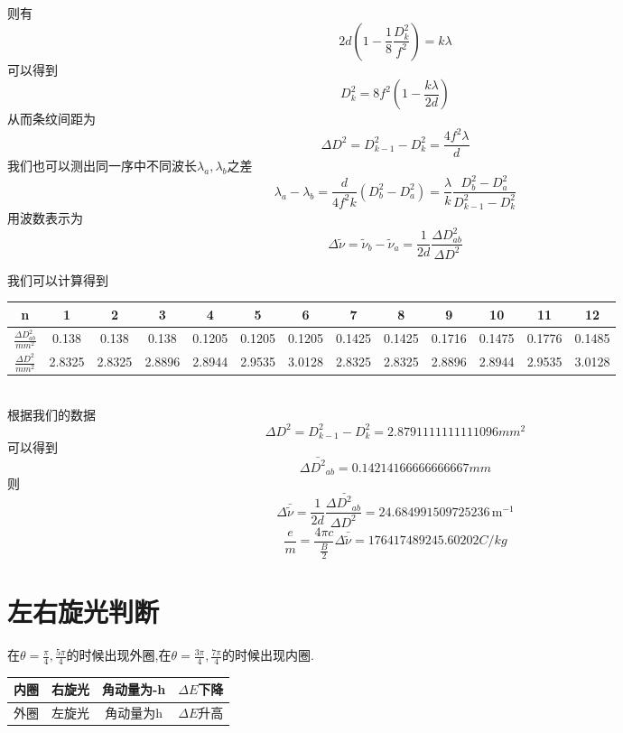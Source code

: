 \documentclass[10pt, a4paper]{article}
\begin{document}
	则有
	\begin{equation}
		2d(1-\frac{1}{8}\frac{D^2_k}{f^2}) = k\lambda
	\end{equation}
	可以得到
	\begin{equation}
		D^2_k =8f^2(1 - \frac{k\lambda}{2d} )
	\end{equation}
	从而条纹间距为
	\begin{equation}
		\Delta D^2 = D_{k-1}^2 - D_k^2 = \frac{4f^2\lambda}{d}
	\end{equation}
	我们也可以测出同一序中不同波长\(\lambda_a,\lambda_b\)之差
	\begin{equation}
	   \lambda_a-\lambda_b = \frac{d}{4f^2k}(D_b^2-D_a^2) = \frac{\lambda}{k}\frac{D_b^2-D_a^2}{D_{k-1}^2-D_k^2}
	\end{equation}
	用波数表示为
	\begin{equation}
		\Delta\tilde{\nu} = \tilde{\nu}_b - \tilde{\nu}_a = \frac{1}{2d}\frac{\Delta D_{ab}^2}{\Delta D^2}
	\end{equation}
	
	我们可以计算得到\\
	\begin{tabular}{|c|c|c|c|c|c|c|c|c|c|c|c|c|}
		\hline
		n & 1 & 2 & 3&4&5&6&7&8&9&10&11&12\\
		\hline
		\(\frac{\Delta D_{ab}^2}{mm^2}\)&0.138&  0.138&  0.138&  0.1205 &0.1205& 0.1205 &0.1425& 0.1425 &0.1716& 0.1475&0.1776& 0.1485\\
		\hline
        \(\frac{\Delta D^2}{mm^2}\)&2.8325& 2.8325 &2.8896& 2.8944 &2.9535 &3.0128& 2.8325 &2.8325 &2.8896& 2.8944&2.9535 &3.0128\\
		\hline
	\end{tabular}\\
	根据我们的数据
	\begin{equation}
		\Delta D^2 = D_{k-1}^2 -D_k^2= 2.8791111111111096mm^2
	\end{equation}
	可以得到
	\begin{equation}
		\Delta\bar{ D^2}_{ab} = 0.14214166666666667 mm
	\end{equation}
	则
	\begin{equation}
    \Delta \bar{\tilde{\nu}} = \frac{1}{2d} \frac{\Delta\bar{D^2}_{ab}}{\Delta D^2} = 24.684991509725236\,\text{m}^{-1}
    \end{equation}
	\begin{equation}
		\frac{e}{m} = \frac{4\pi c}{\frac{B}{2}}\Delta \bar{\tilde{\nu}}=176417489245.60202C/kg
	\end{equation}
	\section{左右旋光判断}
	在\(\theta = \frac{\pi}{4},\frac{5\pi}{4}\)的时候出现外圈,在\(\theta = \frac{3\pi}{4},\frac{7\pi}{4}\)的时候出现内圈.\\
	\begin{tabular}{|c|c|c|c|}
		\hline
		内圈&右旋光&角动量为-h&\(\Delta E\)下降\\
		\hline
        外圈&左旋光&角动量为h&\(\Delta E\)升高\\
		\hline
	\end{tabular}\\
\end{document}
